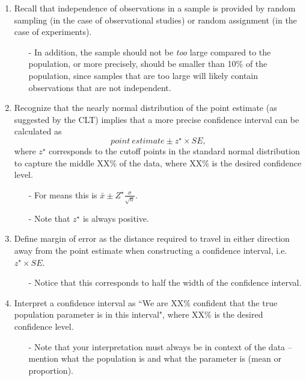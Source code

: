 \documentclass[11pt]{article}
\begin{document}
\begin{enumerate}[resume]
\item Recall that independence of observations in a sample is provided by random sampling (in the case of observational studies) or random assignment (in the case of experiments).
\begin{itemize}
\item[-] In addition, the sample should not be \textit{too} large compared to the population, or more precisely, should be smaller than 10\% of the population, since samples that are too large will likely contain observations that are not independent.
\end{itemize}

\item Recognize that the nearly normal distribution of the point estimate (as suggested by the CLT) implies that a more precise confidence interval can be calculated as
\[ point~estimate \pm z^{\star} \times SE, \] 
where $z^{\star}$ corresponds to the cutoff points in the standard normal distribution to capture the middle XX\% of the data, where XX\% is the desired confidence level.
\begin{itemize}
\item[-] For means this is $\bar{x} \pm Z^\star \frac{\sigma}{\sqrt{n}}$.
\item[-] Note that $z^{\star}$ is always positive.
\end{itemize}

\item Define margin of error as the distance required to travel in either direction away from the point estimate when constructing a confidence interval, i.e. $z^{\star} \times SE$.
\begin{itemize}
\item[-] Notice that this corresponds to half the width of the confidence interval.
\end{itemize}

\item Interpret a confidence interval as ``We are XX\% confident that the true population parameter is in this interval", where XX\% is the desired confidence level.
\begin{itemize}
\item[-] Note that your interpretation must always be in context of the data -- mention what the population is and what the parameter is (mean or proportion).
\end{itemize}


\end{enumerate}
\end{document}

